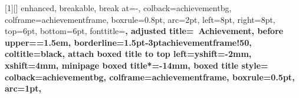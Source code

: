 
\theoremstyle{remark}
\newtheorem{conclusion}{Conclusion}


\theoremstyle{definition}
\newtheorem{derivation}{Derivation}[chapter]
\newenvironment{derivation@env}[1][]
  {\begin{derivation}\ifstrempty{#1}{}{\textnormal{(#1)}}\itshape}
  {\hfill$\square$\end{derivation}}


\newtheorem{calculation}{Calculation}[chapter]


\theoremstyle{definition}
\newtheorem{step}{Step}


[1][]{%
  enhanced,
  breakable,
  break at=-\baselineskip,
  colback=achievementbg,
  colframe=achievementframe,
  boxrule=0.8pt,
  arc=2pt,
  left=8pt,
  right=8pt,
  top=6pt,
  bottom=6pt,
  fonttitle=\bfseries\sffamily,
  adjusted title={\achievementicon~Achievement},
  before upper={\parindent=1.5em},
  borderline={1.5pt}{-3pt}{achievementframe!50},
  coltitle=black,
  attach boxed title to top left={yshift=-2mm, xshift=4mm},
  minipage boxed title*=-14mm,
  boxed title style={
    colback=achievementbg,
    colframe=achievementframe,
    boxrule=0.5pt,
    arc=1pt,
      }
}

